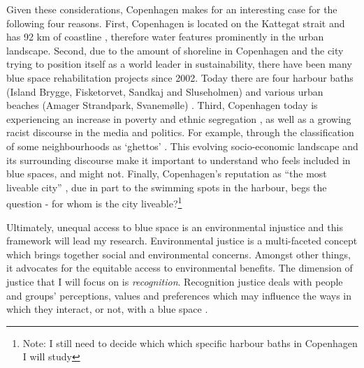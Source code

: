 \documentclass{article}
\begin{document}
Given these considerations, Copenhagen makes for an interesting case for the following four reasons.
First, Copenhagen is located on the Kattegat strait and has 92 km of coastline \parencite{comertler2017greens}, therefore water features prominently in the urban landscape.
Second, due to the amount of shoreline in Copenhagen and the city trying to position itself as a world leader in sustainability, there have been many blue space rehabilitation projects since 2002. Today there are four harbour baths (Island Brygge, Fisketorvet, Sandkaj and Sluseholmen) and various urban beaches (Amager Strandpark, Svanemølle) \parencite{visitcopenhagen_baths}.
Third, Copenhagen today is experiencing an increase in poverty and ethnic segregation \parencite{moller2015socioeconomic}, as well as a growing racist discourse in the media and politics. For example, through the classification of some neighbourhoods as `ghettos' \parencite{simonsen2008practice}. This evolving socio-economic landscape and its surrounding discourse make it important to understand who feels included in blue spaces, and might not. 
Finally, Copenhagen's reputation as ``the most liveable city'' \parencite{visitdenmark_2021}, due in part to the swimming spots in the harbour, begs the question - for whom is the city liveable?\footnote{Note: I still need to decide which which specific harbour baths in Copenhagen I will study}

Ultimately, unequal access to blue space is an environmental injustice and this framework will lead my research.
Environmental justice is a multi-faceted concept which brings together social and environmental concerns. Amongst other things, it advocates for the equitable access to environmental benefits. %
The dimension of justice that I will focus on is \textit{recognition}. Recognition justice deals with people and groups' perceptions, values and preferences which may influence the ways in which they interact, or not, with a blue space \parencite{anguelovski2020expanding}.
\end{document}
